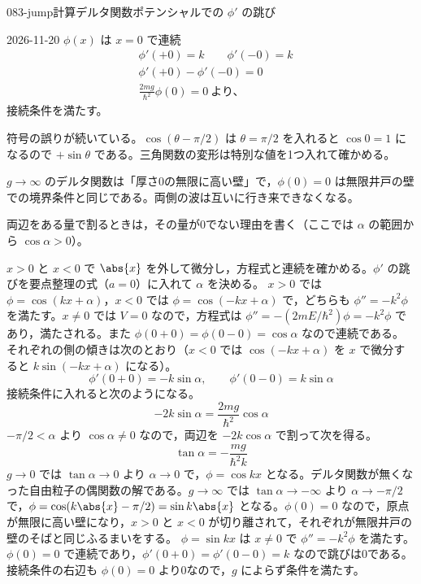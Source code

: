 \documentclass[uplatex,dvipdfmx,a4paper,11pt]{jsarticle}
\begin{document}
\begin{mondai}{083-jump}{計算}{デルタ関数ポテンシャルでの $\phi'$ の跳び}
\begin{kotaeutsushi}{2026-11-20}
$\phi(x)$ は $x=0$ で連続
\begin{align*}
&\phi'(+0)=k\qquad\phi'(-0)=k\\
&\phi'(+0)-\phi'(-0)=0\\
&\frac{2mg}{\hbar^{2}}\phi(0)=0\ \text{より、}
\end{align*}
接続条件を満たす。
\end{kotaeutsushi}
\begin{kizuki}
\item {} 符号の誤りが続いている。$\cos(\theta-\pi/2)$ は $\theta=\pi/2$ を入れると $\cos0=1$ になるので $+\sin\theta$ である。三角関数の変形は特別な値を1つ入れて確かめる。
\item $g\to\infty$ のデルタ関数は「厚さ0の無限に高い壁」で，$\phi(0)=0$ は無限井戸の壁での境界条件と同じである。両側の波は互いに行き来できなくなる。
\item 両辺をある量で割るときは，その量が0でない理由を書く（ここでは $\alpha$ の範囲から $\cos\alpha>0$）。
\end{kizuki}
\begin{tadashii}
\houshin $x>0$ と $x<0$ で $\abs{x}$ を外して微分し，方程式と連続を確かめる。$\phi'$ の跳びを要点整理の式（$a=0$）に入れて $\alpha$ を決める。
\keisan
{} $x>0$ では $\phi=\cos(kx+\alpha)$，$x<0$ では $\phi=\cos(-kx+\alpha)$ で，どちらも $\phi''=-k^{2}\phi$ を満たす。$x\ne 0$ では $V=0$ なので，方程式は $\phi''=-(2mE/\hbar^{2})\phi=-k^{2}\phi$ であり，満たされる。また $\phi(0+0)=\phi(0-0)=\cos\alpha$ なので連続である。
 それぞれの側の傾きは次のとおり（$x<0$ では $\cos(-kx+\alpha)$ を $x$ で微分すると $k\sin(-kx+\alpha)$ になる）。
\[ \phi'(0+0)=-k\sin\alpha,\qquad \phi'(0-0)=k\sin\alpha \]
接続条件に入れると次のようになる。
\[ -2k\sin\alpha=\frac{2mg}{\hbar^{2}}\cos\alpha \]
$-\pi/2<\alpha$ より $\cos\alpha\ne 0$ なので，両辺を $-2k\cos\alpha$ で割って次を得る。
\[ \tan\alpha=-\frac{mg}{\hbar^{2}k} \]
 $g\to 0$ では $\tan\alpha\to 0$ より $\alpha\to 0$ で，$\phi=\cos kx$ となる。デルタ関数が無くなった自由粒子の偶関数の解である。$g\to\infty$ では $\tan\alpha\to-\infty$ より $\alpha\to-\pi/2$ で，$\phi=\cos(k\abs{x}-\pi/2)=\sin k\abs{x}$ となる。$\phi(0)=0$ なので，原点が無限に高い壁になり，$x>0$ と $x<0$ が切り離されて，それぞれが無限井戸の壁のそばと同じふるまいをする。
 $\phi=\sin kx$ は $x\ne 0$ で $\phi''=-k^{2}\phi$ を満たす。$\phi(0)=0$ で連続であり，$\phi'(0+0)=\phi'(0-0)=k$ なので跳びは0である。接続条件の右辺も $\phi(0)=0$ より0なので，$g$ によらず条件を満たす。

\end{tadashii}
\end{mondai}
\end{document}
